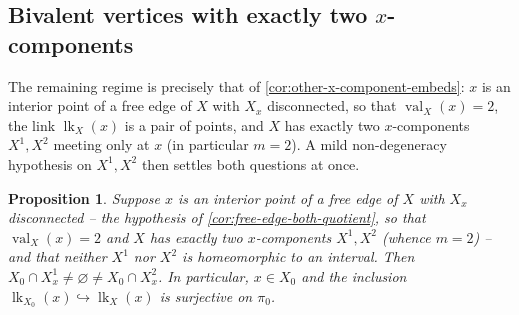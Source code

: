 \documentclass[reqno]{amsart}
\newtheorem{proposition}[theorem]{Proposition}
\theoremstyle{definition}
\DeclareMathOperator{\lk}{lk}
\DeclareMathOperator{\val}{val}
\numberwithin{equation}{section}
\begin{document}
\subsection{Bivalent vertices with exactly two \(x\)-components}

The remaining regime is precisely that of
\cref{cor:other-x-component-embeds}: \(x\) is an interior point of a
free edge of \(X\) with \(X_x\) disconnected, so that
\(\val_X(x)=2\), the link \(\lk_X(x)\) is a pair of points, and \(X\)
has exactly two \(x\)-components \(X^1,X^2\) meeting only at \(x\) (in
particular \(m=2\)). A mild non-degeneracy hypothesis on \(X^1,X^2\)
then settles both questions at once.

\begin{proposition}\label{prop:X0-contains-nontrivial-junction}
Suppose \(x\) is an interior point of a free edge of \(X\) with
\(X_x\) disconnected -- the hypothesis of
\cref{cor:free-edge-both-quotient}, so that \(\val_X(x)=2\) and \(X\)
has exactly two \(x\)-components \(X^1,X^2\) (whence \(m=2\)) -- and
that neither \(X^1\) nor \(X^2\) is homeomorphic to an interval.
Then
\(X_0\cap X^1_x\neq\varnothing\neq X_0\cap X^2_x\). In particular, \(x\in X_0\) and the inclusion \(\lk_{X_0}(x)\hookrightarrow \lk_X(x)\) is surjective on \(\pi_0\).
\end{proposition}
\end{document}
